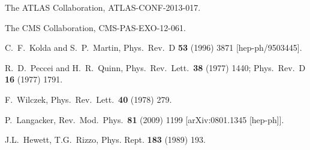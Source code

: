 \documentclass[12pt,a4paper]{article}
\begin{document}
\newpage
\begin{thebibliography}{999}

The ATLAS Collaboration,  ATLAS-CONF-2013-017.

The CMS Collaboration,
CMS-PAS-EXO-12-061.

C.~F.~Kolda and S.~P.~Martin,
Phys.\ Rev.\ D {\bf 53} (1996) 3871
[hep-ph/9503445].

R.~D.~Peccei and H.~R.~Quinn,
Phys.\ Rev.\ Lett.\  {\bf 38} (1977) 1440;
Phys.\ Rev.\ D {\bf 16} (1977) 1791.

F.~Wilczek,
Phys.\ Rev.\ Lett.\  {\bf 40} (1978) 279.

P.~Langacker,
Rev.\ Mod.\ Phys.\  {\bf 81} (2009) 1199
[arXiv:0801.1345 [hep-ph]].

J.L.~Hewett, T.G.~Rizzo, Phys. Rept. {\bf 183} (1989) 193.


\end{thebibliography}
\end{document}
